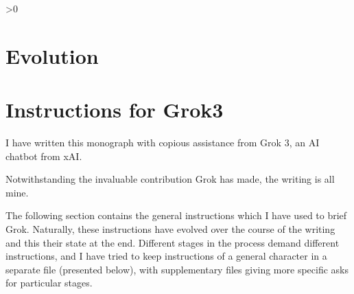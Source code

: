 \documentclass[10pt,titlepage]{book}
\newcommand{\ignore}[1]{}
\newcommand{\resetnotes}{%
  \ifnum\value{endnote}>0%
  \theendnotes%
  \setcounter{endnote}{0}%
  \else%
  \fi%
}
\begin{document}
%
\resetnotes

\chapter{Evolution}

\cite{donald1991,murray2017evolution}

\ignore{
\chapter{Synthetic Epistemology and Foundational Abstract Semantics}


\resetnotes

\chapter{The Evolution of Declarative Knowledge}\label{EDK}

%
\resetnotes


\chapter{The Fundamental Triple Trichotomy}\label{FTT}

%
\resetnotes
}%

\appendix

\ignore{
\chapter{The Philosophy of Rudolf Carnap}\label{PRC}


\resetnotes

}%

\appendix

\chapter{Instructions for Grok3}\label{InstructionsForGrok}

I have written this monograph with copious assistance from Grok 3, an AI chatbot from xAI.

Notwithstanding the invaluable contribution Grok has made, the writing is all mine.

The following section contains the general instructions which I have used to brief Grok.
Naturally, these instructions have evolved over the course of the writing and this their state at the end.
Different stages in the process demand different instructions, and I have tried to keep instructions of a general character  in a separate file (presented below), with supplementary files giving more specific asks for particular stages.
\end{document}
